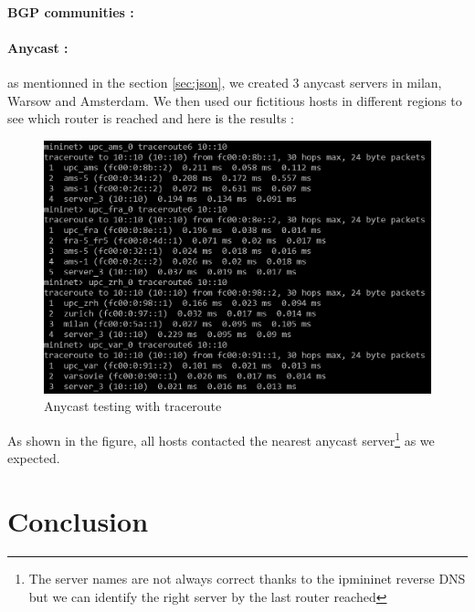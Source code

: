 \documentclass[letter, 9pt, conference]{ieeeconf}
\begin{document}
\paragraph{BGP communities :}

\paragraph{Anycast :} as mentionned in the section \ref{sec:json}, we created 3 anycast servers in milan, Warsow and Amsterdam. We then used our fictitious hosts in different regions to see which router is reached and here is the results : 

\begin{figure}[h!]
    \includegraphics[width=\linewidth]{anycast_test.PNG}
    \caption{Anycast testing with traceroute}
    \label{fig:anycast_test}
\end{figure}

As shown in the figure, all hosts contacted the nearest anycast server\footnote{The server names are not always correct thanks to the ipmininet reverse DNS but we can identify the right server by the last router reached} as we expected. 

\section{Conclusion}


\addtolength{\textheight}{-10cm}   %
\end{document}
